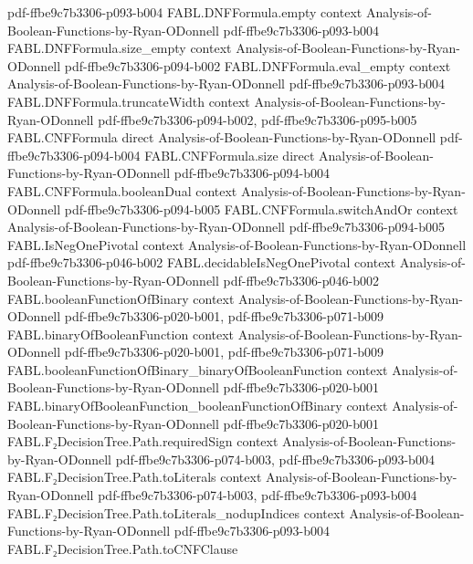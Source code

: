 \begin{theorem}
  {pdf-ffbe9c7b3306-p093-b004}
\proofstep
  {FABL.DNFFormula.empty}
  {context}
  {Analysis-of-Boolean-Functions-by-Ryan-ODonnell}
  {pdf-ffbe9c7b3306-p093-b004}
\proofstep
  {FABL.DNFFormula.size_empty}
  {context}
  {Analysis-of-Boolean-Functions-by-Ryan-ODonnell}
  {pdf-ffbe9c7b3306-p094-b002}
\proofstep
  {FABL.DNFFormula.eval_empty}
  {context}
  {Analysis-of-Boolean-Functions-by-Ryan-ODonnell}
  {pdf-ffbe9c7b3306-p093-b004}
\proofstep
  {FABL.DNFFormula.truncateWidth}
  {context}
  {Analysis-of-Boolean-Functions-by-Ryan-ODonnell}
  {pdf-ffbe9c7b3306-p094-b002,
    pdf-ffbe9c7b3306-p095-b005}
\proofstep
  {FABL.CNFFormula}
  {direct}
  {Analysis-of-Boolean-Functions-by-Ryan-ODonnell}
  {pdf-ffbe9c7b3306-p094-b004}
\proofstep
  {FABL.CNFFormula.size}
  {direct}
  {Analysis-of-Boolean-Functions-by-Ryan-ODonnell}
  {pdf-ffbe9c7b3306-p094-b004}
\proofstep
  {FABL.CNFFormula.booleanDual}
  {context}
  {Analysis-of-Boolean-Functions-by-Ryan-ODonnell}
  {pdf-ffbe9c7b3306-p094-b005}
\proofstep
  {FABL.CNFFormula.switchAndOr}
  {context}
  {Analysis-of-Boolean-Functions-by-Ryan-ODonnell}
  {pdf-ffbe9c7b3306-p094-b005}
\proofstep
  {FABL.IsNegOnePivotal}
  {context}
  {Analysis-of-Boolean-Functions-by-Ryan-ODonnell}
  {pdf-ffbe9c7b3306-p046-b002}
\proofstep
  {FABL.decidableIsNegOnePivotal}
  {context}
  {Analysis-of-Boolean-Functions-by-Ryan-ODonnell}
  {pdf-ffbe9c7b3306-p046-b002}
\proofstep
  {FABL.booleanFunctionOfBinary}
  {context}
  {Analysis-of-Boolean-Functions-by-Ryan-ODonnell}
  {pdf-ffbe9c7b3306-p020-b001,
    pdf-ffbe9c7b3306-p071-b009}
\proofstep
  {FABL.binaryOfBooleanFunction}
  {context}
  {Analysis-of-Boolean-Functions-by-Ryan-ODonnell}
  {pdf-ffbe9c7b3306-p020-b001,
    pdf-ffbe9c7b3306-p071-b009}
\proofstep
  {FABL.booleanFunctionOfBinary_binaryOfBooleanFunction}
  {context}
  {Analysis-of-Boolean-Functions-by-Ryan-ODonnell}
  {pdf-ffbe9c7b3306-p020-b001}
\proofstep
  {FABL.binaryOfBooleanFunction_booleanFunctionOfBinary}
  {context}
  {Analysis-of-Boolean-Functions-by-Ryan-ODonnell}
  {pdf-ffbe9c7b3306-p020-b001}
\proofstep
  {FABL.F₂DecisionTree.Path.requiredSign}
  {context}
  {Analysis-of-Boolean-Functions-by-Ryan-ODonnell}
  {pdf-ffbe9c7b3306-p074-b003,
    pdf-ffbe9c7b3306-p093-b004}
\proofstep
  {FABL.F₂DecisionTree.Path.toLiterals}
  {context}
  {Analysis-of-Boolean-Functions-by-Ryan-ODonnell}
  {pdf-ffbe9c7b3306-p074-b003,
    pdf-ffbe9c7b3306-p093-b004}
\proofstep
  {FABL.F₂DecisionTree.Path.toLiterals_nodupIndices}
  {context}
  {Analysis-of-Boolean-Functions-by-Ryan-ODonnell}
  {pdf-ffbe9c7b3306-p093-b004}
\proofstep
  {FABL.F₂DecisionTree.Path.toCNFClause}

\end{theorem}
